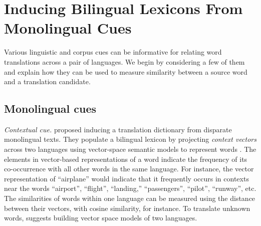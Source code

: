 \documentclass{article}
\newcommand{\mtodo}[1]{}
\newcommand{\secref}[1]{Section~\ref{#1}}
\begin{document}



\section{Inducing Bilingual Lexicons From Monolingual Cues}\label{sect:cues}

Various linguistic and corpus cues can be informative for relating word translations across a pair of languages.\mtodo{Little technical details, i.e. no metric defs, etc. Add?}  We begin by considering a few of them and explain how they can be used to measure similarity between a source word and a translation candidate.

\subsection{Monolingual cues}

\noindent\emph{Contextual cue.} \cite{Rapp:1999} proposed inducing a translation dictionary from disparate monolingual texts.  They populate a bilingual lexicon by projecting {\it context vectors} across two languages using vector-space semantic models to represent words  \cite{Deerwester:1990}.  The elements in vector-based representations of a word indicate the frequency of its co-occurrence with all other words in the same language.  For instance, the vector representation of ``airplane'' would indicate that it frequently occurs in contexts near the words ``airport'', ``flight'', ``landing,'' ``passengers'', ``pilot'', ``runway'',  etc.  The similarities of words within one language can be measured using the distance between their vectors, with cosine similarity, for instance.  To translate unknown words, \cite{Rapp:1999} suggests building vector space models of two languages.  \\
\end{document}
